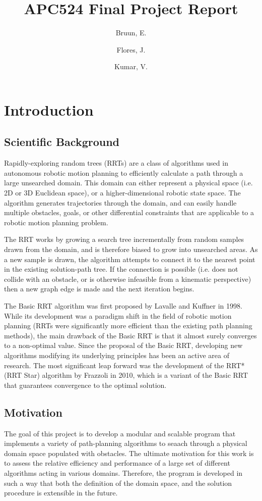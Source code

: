\documentclass[10pt]{article}
\title{APC524 Final Project Report}
\author{Bruun, E. \and Flores, J. \and Kumar, V.}
\begin{document}
\maketitle

\section{Introduction}
\label{sec:intro}
	\subsection{Scientific Background}
		Rapidly-exploring random trees (RRTs) are a class of algorithms used in autonomous robotic motion planning to efficiently calculate a path through a large unsearched domain. This domain can either represent a physical space (i.e. 2D or 3D Euclidean space), or a higher-dimensional robotic state space. The algorithm generates trajectories through the domain, and can easily handle multiple obstacles, goals, or other differential constraints that are applicable to a robotic motion planning problem.
		
		The RRT works by growing a search tree incrementally from random samples drawn from the domain, and is therefore biased to grow into unsearched areas. As a new sample is drawn, the algorithm attempts to connect it to the nearest point in the existing solution-path tree. If the connection is possible (i.e. does not collide with an obstacle, or is otherwise infeasible from a kinematic perspective) then a new graph edge is made and the next iteration begins.
		
		The Basic RRT algorithm was first proposed by Lavalle and Kuffner in 1998. While its development was a paradigm shift in the field of robotic motion planning (RRTs were significantly more efficient than the existing path planning methods), the main drawback of the Basic RRT is that it almost surely converges to a non-optimal value. Since the proposal of the Basic RRT, developing new algorithms modifying its underlying principles has been an active area of research. The most significant leap forward was the development of the RRT* (RRT Star) algorithm by Frazzoli in 2010, which is a variant of the Basic RRT that guarantees convergence to the optimal solution.

	\subsection{Motivation}
		The goal of this project is to develop a modular and scalable program that implements a variety of path-planning algorithms to seaach through a physical domain space populated with obstacles. The ultimate motivation for this work is to assess the relative efficiency and performance of a large set of different algorithms acting in various domains. Therefore, the program is developed in such a way that both the definition of the domain space, and the solution procedure is extensible in the future. 
\end{document}
